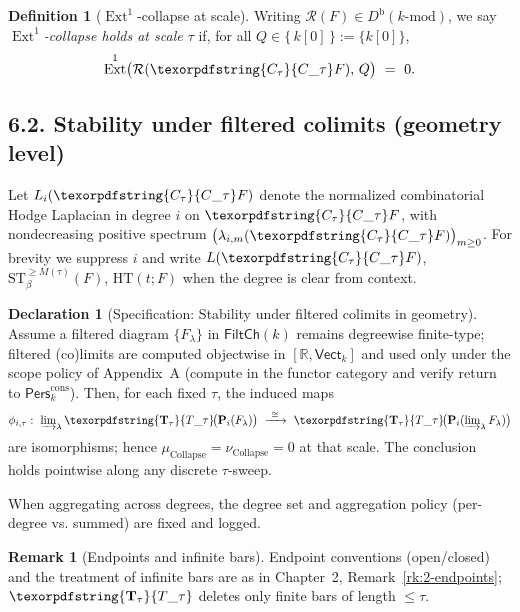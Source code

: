 \documentclass[11pt]{article}
\DeclareMathOperator{\Ext}{Ext}
\DeclareRobustCommand{\hyp}{\nobreakdash-}
\newcommand{\Pers}{\mathsf{Pers}}
\newcommand{\Rfun}{\mathcal{R}}
\numberwithin{equation}{section}
\theoremstyle{definition}
\newtheorem{definition}[theorem]{Definition}
\newtheorem{remark}[theorem]{Remark}
\newtheorem{declaration}[theorem]{Declaration}
\DeclareRobustCommand{\FiltCh}[1]{\mathsf{FiltCh}(#1)}
\DeclareRobustCommand{\Ttau}{\texorpdfstring{\ensuremath{\mathbf{T}_{\tau}}}{T\_\tau}}
\DeclareRobustCommand{\Ctau}{\texorpdfstring{\ensuremath{C_{\tau}}}{C\_\tau}}
\DeclareRobustCommand{\muc}{\mu_{\mathrm{Collapse}}}
\DeclareRobustCommand{\nuc}{\nu_{\mathrm{Collapse}}}
\DeclareRobustCommand{\Qtest}{\{\,k[0]\,\}}
\begin{document}
\begin{definition}[\(\Ext^1\)\hyp collapse at scale]\label{def:ext-collapse}
Writing \(\Rfun(F)\in D^{\mathrm{b}}(k\text{-mod})\), we say \emph{\(\Ext^1\)\hyp collapse holds at scale \(\tau\)} if, for all \(Q\in\Qtest:=\{k[0]\}\),
\[
  \Ext^1\!\big(\Rfun(\Ctau F),\, Q\big)\ =\ 0.
\]
\end{definition}

\subsection*{6.2. Stability under filtered colimits (geometry level)}
Let \(L_i(\Ctau F)\) denote the normalized combinatorial Hodge Laplacian in degree \(i\) on \(\Ctau F\), with nondecreasing positive spectrum \(\bigl(\lambda_{i,m}(\Ctau F)\bigr)_{m\ge 0}\). For brevity we suppress \(i\) and write \(L(\Ctau F)\), \(\mathrm{ST}_{\beta}^{\ge M(\tau)}(F)\), \(\mathrm{HT}(t;F)\) when the degree is clear from context.
\begin{declaration}[Specification: Stability under filtered colimits in geometry]\label{spec:geom-colim}
Assume a filtered diagram \(\{F_\lambda\}\) in \(\FiltCh{k}\) remains degreewise finite\hyp type; filtered (co)limits are computed objectwise in \([\mathbb{R},\mathsf{Vect}_k]\) and used only under the scope policy of Appendix~A (compute in the functor category and verify return to \(\Pers^{\mathrm{cons}}_k\)).
Then, for each fixed \(\tau\), the induced maps
\[
  \phi_{i,\tau}:\ \varinjlim\nolimits_\lambda \Ttau\!\big(\mathbf{P}_i(F_\lambda)\big)\ \xrightarrow{\ \cong\ }\ \Ttau\!\big(\mathbf{P}_i(\varinjlim\nolimits_\lambda F_\lambda)\big)
\]
are isomorphisms; hence \(\muc=\nuc=0\) at that scale. The conclusion holds pointwise along any discrete \(\tau\)\hyp sweep.
\end{declaration}

When aggregating across degrees, the degree set and aggregation policy (per-degree vs. summed) are fixed and logged.

\begin{remark}[Endpoints and infinite bars]\label{rk:endpoints-ch6}
Endpoint conventions (open/closed) and the treatment of infinite bars are as in Chapter~2, Remark~\ref{rk:2-endpoints}; \(\Ttau\) deletes only finite bars of length \(\le\tau\).
\end{remark}
\end{document}
